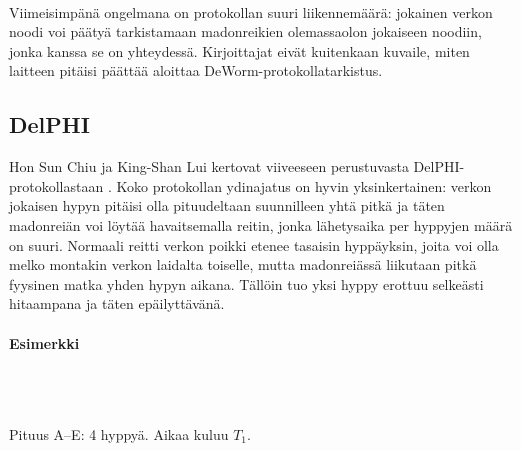 \documentclass[finnish]{tktltiki2}
\theoremstyle{definition}
\theoremstyle{remark}
\begin{document}
\noindent \\
Viimeisimpänä ongelmana on protokollan suuri liikennemäärä: jokainen verkon noodi voi päätyä tarkistamaan madonreikien olemassaolon jokaiseen noodiin, jonka kanssa se on yhteydessä. Kirjoittajat eivät kuitenkaan kuvaile, miten laitteen pitäisi päättää aloittaa DeWorm-protokollatarkistus.

\subsection{DelPHI}

Hon Sun Chiu ja King-Shan Lui kertovat viiveeseen perustuvasta DelPHI-protokollastaan \cite{delphi}. Koko protokollan ydinajatus on hyvin yksinkertainen: verkon jokaisen hypyn pitäisi olla pituudeltaan suunnilleen yhtä pitkä ja täten madonreiän voi löytää havaitsemalla reitin, jonka lähetysaika per hyppyjen määrä on suuri. Normaali reitti verkon poikki etenee tasaisin hyppäyksin, joita voi olla melko montakin verkon laidalta toiselle, mutta madonreiässä liikutaan pitkä fyysinen matka yhden hypyn aikana. Tällöin tuo yksi hyppy erottuu selkeästi hitaampana ja täten epäilyttävänä.

\paragraph{Esimerkki}

\noindent\\

\noindent\\
Pituus A--E: 4 hyppyä. Aikaa kuluu $T_1$.

\noindent\\
\end{document}
